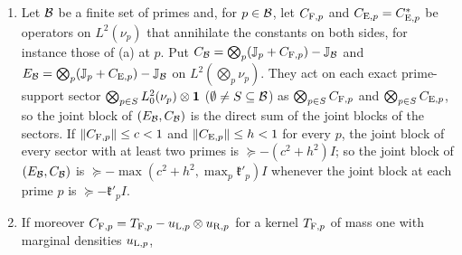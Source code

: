 \begin{lemma}
\begin{enumerate}[label=\textup{(\alph*)}]
 a Hermitian test of size $2n$, rational of size $4n$ in real form
 (\cref{rem:realified-gates}). For each row $\bullet$ let $e_\bullet$ bound the norm of
 the complementary-mean operator $T^\bullet_{\rm mean}$ of
 \cref{prop:conditional-star}(b) for $D_\bullet$ on $L^2_0(\lambda)$, where
 $\lambda$ is the product of the allowed-set laws, divided by $\kappa_0r$
 (for instance $\mathsf e_\star$ of \cref{prop:conditional-star}(b) for
 $D_\bullet$); let $S^\star_\bullet\ge\norm{P_0K^{\rm st}_\bullet P_0}$ for the star part
 $K^{\rm st}_\bullet$ of $K_\bullet$, $N_\bullet\ge\norm{T^\bullet_{\rm ns}}
 +\norm{T^\bullet_{\rm coll}}$ for its nonstar and collision parts,
 $\eps_\bullet\ge|Z_\bullet-1|$ with $\eps_\bullet<1$, and
 $m_\bullet\ge\norm{P_0K_\bullet\one},\norm{P_0K_\bullet^*\one}$, all on $L^2(\mu)$. Then
 \[
  \begin{pmatrix}C_{\rm E}&C_{\rm F}\\C_{\rm F}^*&C_{\rm E}\end{pmatrix}
  \succeq-\mathfrak k_pI\quad\text{on }L^2(\nu)\oplus L^2(\nu),\qquad
  \mathfrak k_p=e^{\ell_{\rm E}}\Bigl[\frac{\kappa_0r(\mathsf k+e_{\rm F}+e_{\rm E})}{I_0}
  +\mathfrak c_{\rm F}+\mathfrak c_{\rm E}\Bigr],
 \]
 where $\mathfrak c_\bullet=(\eps_\bullet S^\star_\bullet+N_\bullet)/(1-\eps_\bullet)
 +m_\bullet^2/(1-\eps_\bullet)^2$.
\item Let $\mathcal B$ be a finite set of primes and, for $p\in\mathcal B$, let $C_{{\rm F},p}$ and
 $C_{{\rm E},p}=C_{{\rm E},p}^*$ be operators on $L^2(\nu_p)$ that annihilate the
 constants on both sides, for instance those of (a) at $p$. Put
 $C_\mathcal B=\bigotimes_p(\mathbb J_p+C_{{\rm F},p})-\mathbb J_\mathcal B$ and
 $E_\mathcal B=\bigotimes_p(\mathbb J_p+C_{{\rm E},p})-\mathbb J_\mathcal B$ on $L^2(\bigotimes_p\nu_p)$.
 They act on each exact prime-support sector
 $\bigotimes_{p\in S}L^2_0(\nu_p)\otimes\mathbf 1$ ($\emptyset\ne S\subseteq\mathcal B$) as
 $\bigotimes_{p\in S}C_{{\rm F},p}$ and $\bigotimes_{p\in S}C_{{\rm E},p}$, so the joint
 block of $(E_\mathcal B,C_\mathcal B)$ is the direct sum of the joint blocks of the sectors. If
 $\left\|C_{{\rm F},p}\right\|\le c<1$ and $\left\|C_{{\rm E},p}\right\|\le h<1$ for every $p$, the
 joint block of every sector with at least two primes is $\succeq-(c^2+h^2)I$; so the
 joint block of $(E_\mathcal B,C_\mathcal B)$ is $\succeq-\max(c^2+h^2,\max_p\mathfrak k'_p)I$
 whenever the joint block at each prime $p$ is $\succeq-\mathfrak k'_pI$.
\item If moreover $C_{{\rm F},p}=T_{{\rm F},p}-u_{{\rm L},p}\otimes u_{{\rm R},p}$ for a
 kernel $T_{{\rm F},p}$ of mass one with marginal densities $u_{{\rm L},p}$,

\end{enumerate}
\end{lemma}
